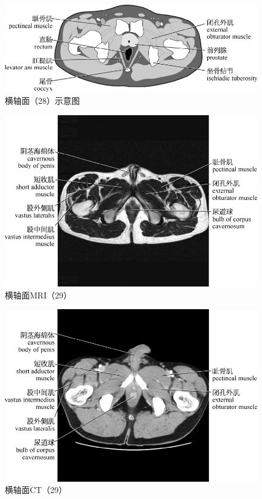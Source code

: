 \begin{figure}[!htbp]
 \centering
 \includegraphics{./images/Image00085.jpg}
 \captionsetup{justification=centering}
 \caption{横轴面（28）示意图}
  \end{figure} 
 \FloatBarrier

\begin{figure}[!htbp]
 \centering
 \includegraphics{./images/Image00086.jpg}
 \captionsetup{justification=centering}
 \caption{横轴面MRI（29）}
  \end{figure} 
 \FloatBarrier

\begin{figure}[!htbp]
 \centering
 \includegraphics{./images/Image00087.jpg}
 \captionsetup{justification=centering}
 \caption{横轴面CT（29）}
  \end{figure} 
 \FloatBarrier

